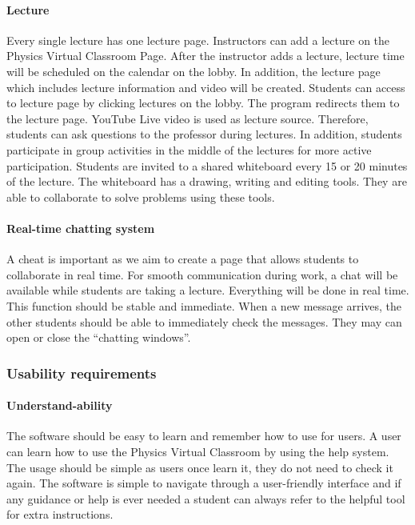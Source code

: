 \documentclass[10pt]{article}
\begin{document}
            \paragraph{Lecture}
                Every single lecture has one lecture page. Instructors can add a lecture on the Physics Virtual Classroom Page. After the instructor adds a lecture, lecture time will be scheduled on the calendar on the lobby. In addition, the lecture page which includes lecture information and video will be created. Students can access to lecture page by clicking lectures on the lobby. The program redirects them to the lecture page. YouTube Live video is used as lecture source. Therefore, students can ask questions to the professor during lectures. In addition, students participate in group activities in the middle of the lectures for more active participation. Students are invited to a shared whiteboard every 15 or 20 minutes of the lecture.  The whiteboard has a drawing, writing and editing tools. They are able to collaborate to solve problems using these tools.

            \paragraph{Real-time chatting system}
                A cheat is important as we aim to create a page that allows students to collaborate in real time. For smooth communication during work, a chat will be available while students are taking a lecture. Everything will be done in real time. This function should be stable and immediate. When a new message arrives, the other students should be able to immediately check the messages. They may can open or close the “chatting windows”.

        \subsubsection{Usability requirements}
            \paragraph{Understand-ability}
                The software should be easy to learn and remember how to use for users. A user can learn how to use the Physics Virtual Classroom by using the help system. The usage should be simple as users once learn it, they do not need to check it again. The software is simple to navigate through a user-friendly interface and if any guidance or help is ever needed a student can always refer to the helpful tool for extra instructions.
\end{document}
